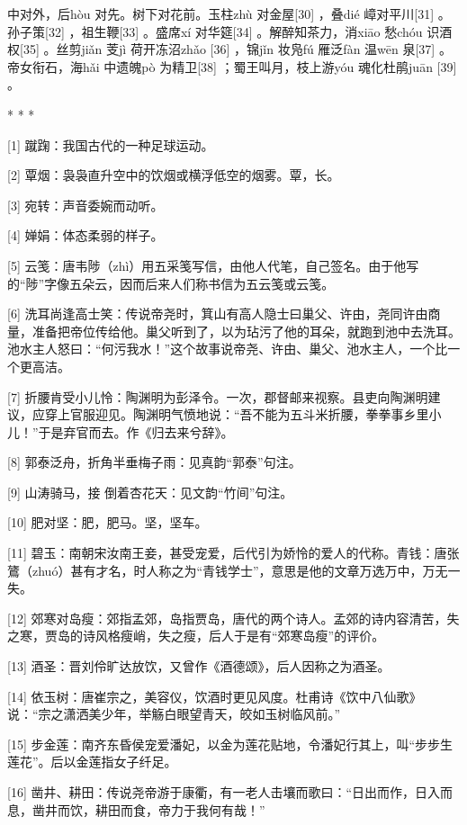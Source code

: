 \documentclass[12pt,UTF8]{ctexbook}
\begin{document}
中对外，后hòu 对先。树下对花前。玉柱zhù 对金屋[30] ，叠dié 嶂对平川[31] 。孙子策[32] ，祖生鞭[33] 。盛席xí 对华筵[34] 。解醉知茶力，消xiāo 愁chóu 识酒权[35] 。丝剪jiǎn 芰jì 荷开冻沼zhǎo [36] ，锦jǐn 妆凫fú 雁泛fàn 温wēn 泉[37] 。帝女衔石，海hǎi 中遗魄pò 为精卫[38] ；蜀王叫月，枝上游yóu 魂化杜鹃juān [39] 。



* * *



[1] 蹴踘：我国古代的一种足球运动。

[2] 覃烟：袅袅直升空中的饮烟或横浮低空的烟雾。覃，长。

[3] 宛转：声音委婉而动听。

[4] 婵娟：体态柔弱的样子。

[5] 云笺：唐韦陟（zhì）用五采笺写信，由他人代笔，自己签名。由于他写的“陟”字像五朵云，因而后来人们称书信为五云笺或云笺。

[6] 洗耳尚逢高士笑：传说帝尧时，箕山有高人隐士曰巢父、许由，尧同许由商量，准备把帝位传给他。巢父听到了，以为玷污了他的耳朵，就跑到池中去洗耳。池水主人怒曰：“何污我水！”这个故事说帝尧、许由、巢父、池水主人，一个比一个更高洁。

[7] 折腰肯受小儿怜：陶渊明为彭泽令。一次，郡督邮来视察。县吏向陶渊明建议，应穿上官服迎见。陶渊明气愤地说：“吾不能为五斗米折腰，拳拳事乡里小儿！”于是弃官而去。作《归去来兮辞》。

[8] 郭泰泛舟，折角半垂梅子雨：见真韵“郭泰”句注。

[9] 山涛骑马，接 倒着杏花天：见文韵“竹间”句注。

[10] 肥对坚：肥，肥马。坚，坚车。

[11] 碧玉：南朝宋汝南王妾，甚受宠爱，后代引为娇怜的爱人的代称。青钱：唐张鷟（zhuó）甚有才名，时人称之为“青钱学士”，意思是他的文章万选万中，万无一失。

[12] 郊寒对岛瘦：郊指孟郊，岛指贾岛，唐代的两个诗人。孟郊的诗内容清苦，失之寒，贾岛的诗风格瘦峭，失之瘦，后人于是有“郊寒岛瘦”的评价。

[13] 酒圣：晋刘伶旷达放饮，又曾作《酒德颂》，后人因称之为酒圣。

[14] 依玉树：唐崔宗之，美容仪，饮酒时更见风度。杜甫诗《饮中八仙歌》说：“宗之潇洒美少年，举觞白眼望青天，皎如玉树临风前。”

[15] 步金莲：南齐东昏侯宠爱潘妃，以金为莲花贴地，令潘妃行其上，叫“步步生莲花”。后以金莲指女子纤足。

[16] 凿井、耕田：传说尧帝游于康衢，有一老人击壤而歌曰：“日出而作，日入而息，凿井而饮，耕田而食，帝力于我何有哉！”
\end{document}

